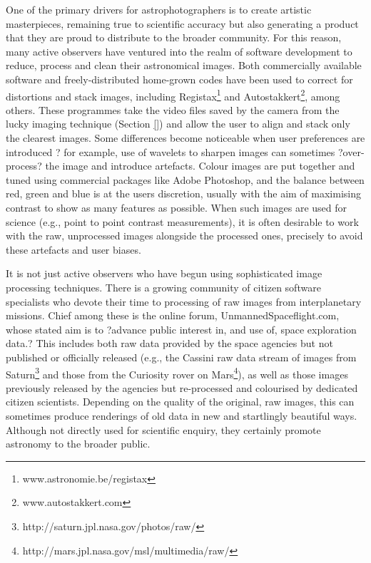 \documentclass{ar2e}
\begin{document}
One of the primary drivers for astrophotographers is to create artistic
masterpieces, remaining true to scientific accuracy but also generating a
product that they are proud to distribute to the broader community.  For this
reason, many active observers have ventured into the realm of software
development to reduce, process and clean their astronomical images.  Both
commercially available software and freely-distributed home-grown codes have
been used to correct for distortions and stack images, including
Registax\footnote{www.astronomie.be/registax} and
Autostakkert\footnote{www.autostakkert.com}, among others.  These programmes
take the video files saved by the camera from the lucky imaging technique
(Section \ref{}) and allow the user to align and stack only the clearest
images.  Some differences become noticeable when user preferences are
introduced ? for example, use of wavelets to sharpen images can sometimes
?over-process? the image and introduce artefacts.  Colour images are put
together and tuned using commercial packages like Adobe Photoshop, and the
balance between red, green and blue is at the users discretion, usually with
the aim of maximising contrast to show as many features as possible.  When
such images are used for science (e.g., point to point contrast measurements),
it is often desirable to work with the raw, unprocessed images alongside the
processed ones, precisely to avoid these artefacts and user biases.

It is not just active observers who have begun using sophisticated image
processing techniques.  There is a growing community of citizen software
specialists who devote their time to processing of raw images from
interplanetary missions.  Chief among these is the online forum,
UnmannedSpaceflight.com, whose stated aim is to ?advance public interest in,
and use of, space exploration data.?  This includes both raw data provided by
the space agencies but not published or officially released (e.g., the Cassini
raw data stream of images from
Saturn\footnote{http://saturn.jpl.nasa.gov/photos/raw/} and those from the
Curiosity rover on Mars\footnote{
http://mars.jpl.nasa.gov/msl/multimedia/raw/}), as well as those images
previously released by the agencies but re-processed and colourised by
dedicated citizen scientists.  Depending on the quality of the original, raw
images, this can sometimes produce renderings of old data in new and
startlingly beautiful ways.  Although not directly used for scientific
enquiry, they certainly promote astronomy to the broader public.
\end{document}
